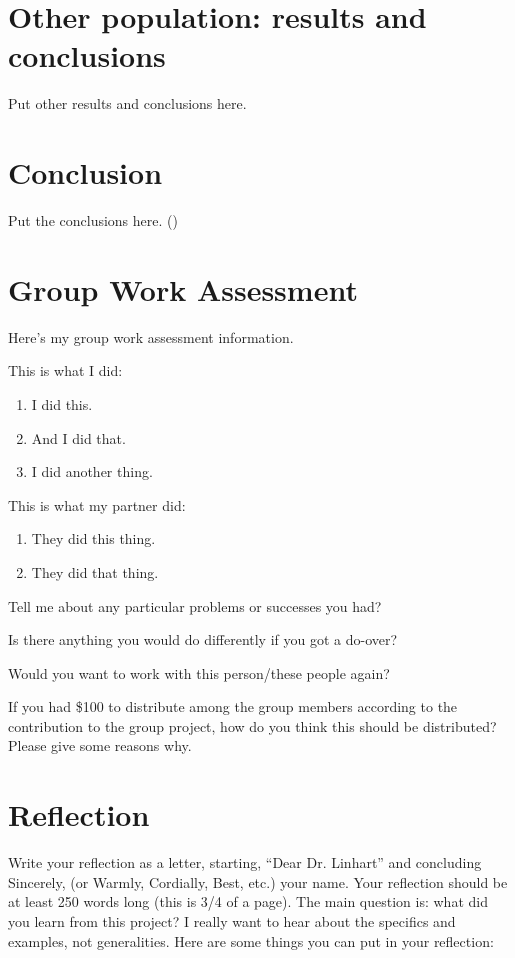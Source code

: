 \documentclass[english]{article}
\begin{document}
\section{Other population: results and conclusions}
Put other results and conclusions here.

\section{Conclusion}
Put the conclusions here. (\cite{taumanifesto})



\section*{Group Work Assessment}

Here's my group work assessment information.

This is what I did:
\begin{enumerate}\itemsep0pt
\item I did this.
\item And I did that.
\item I did another thing.
\end{enumerate}

\medskip
This is what my partner did:
\begin{enumerate}\itemsep0pt
\item They did this thing.
\item They did that thing.
\end{enumerate}

Tell me about any particular problems or successes you had? 

Is there anything you would do differently if you got a do-over?

Would you want to work with this person/these people again?

If you had  \$100 to distribute among the group members according to the contribution to the group project, how do you think this should be distributed?  Please give some reasons why.

\section*{Reflection}

Write your reflection as a letter, starting, ``Dear Dr. Linhart'' and
concluding Sincerely, (or Warmly, Cordially, Best, etc.) your name.
Your reflection should be at least 250 words long (this is 3/4 of a
page).  The main question is: what did you learn from this project?  I
really want to hear about the specifics and examples, not
generalities.  Here are some things you can put in your reflection:
\end{document}
